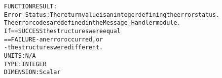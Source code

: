 \begin{alltt}
  FUNCTION RESULT:
        Error_Status:       The return value is an integer defining the error status.
                            The error codes are defined in the Message_Handler module.
                            If == SUCCESS the structures were equal
                               == FAILURE - an error occurred, or
                                          - the structures were different.
                            UNITS:      N/A
                            TYPE:       INTEGER
                            DIMENSION:  Scalar
 
  \end{alltt}
